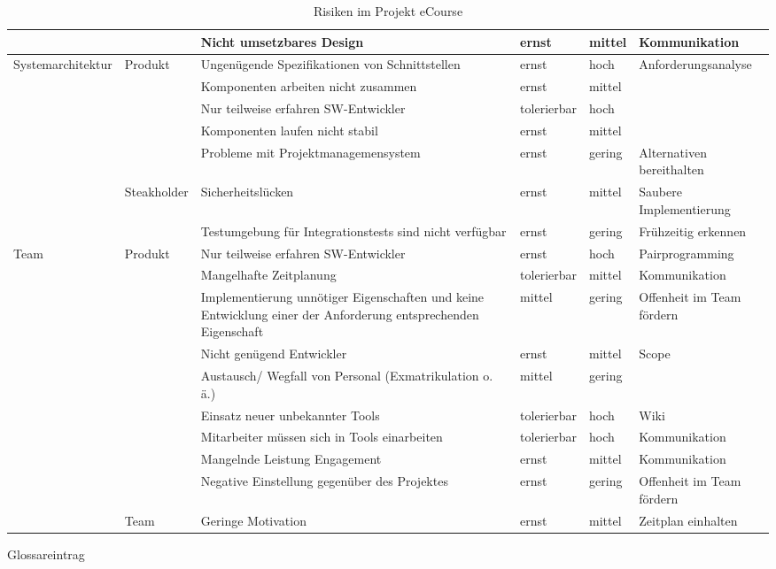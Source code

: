 \begin{table}
\begin{tabularx}{\textwidth}{|l|l|X|l|l|X|}
\hline
 &  & Nicht umsetzbares Design & ernst & mittel & Kommunikation  \\ 
\hline
Systemarchitektur & Produkt & Ungenügende Spezifikationen von Schnittstellen & ernst & hoch & Anforderungsanalyse \\ 
\hline
 &  & Komponenten arbeiten nicht zusammen & ernst & mittel &  \\ 
\hline
 &  & Nur teilweise erfahren SW-Entwickler & tolerierbar & hoch &  \\ 
\hline
 &  & Komponenten laufen nicht stabil & ernst & mittel &  \\ 
\hline
 &  & Probleme mit Projektmanagemensystem & ernst & gering & Alternativen bereithalten \\ 
\hline
 & Steakholder & Sicherheitslücken & ernst & mittel & Saubere Implementierung \\ 
\hline
 &  & Testumgebung für Integrationstests sind nicht verfügbar & ernst & gering & Frühzeitig erkennen \\ 
\hline
Team & Produkt & Nur teilweise erfahren SW-Entwickler & ernst & hoch & Pairprogramming \\ 
\hline
 &  & Mangelhafte Zeitplanung & tolerierbar & mittel & Kommunikation  \\ 
\hline
 &  & Implementierung unnötiger Eigenschaften und keine Entwicklung einer der Anforderung entsprechenden Eigenschaft & mittel & gering & Offenheit im Team fördern \\ 
\hline
 &  & Nicht genügend Entwickler & ernst & mittel & Scope  \\ 
\hline
 &  & Austausch/ Wegfall von Personal (Exmatrikulation o. ä.) & mittel & gering &  \\ 
\hline
 &  & Einsatz neuer unbekannter Tools & tolerierbar & hoch & Wiki \\ 
\hline
 &  & Mitarbeiter müssen sich in Tools einarbeiten & tolerierbar & hoch & Kommunikation  \\ 
\hline
 &  & Mangelnde Leistung Engagement & ernst & mittel & Kommunikation \\ 
\hline
 &  & Negative Einstellung gegenüber des Projektes & ernst & gering & Offenheit im Team fördern \\ 
\hline
 & Team & Geringe Motivation & ernst & mittel & Zeitplan einhalten \\ 
\hline
\end{tabularx}
\caption{Risiken im Projekt eCourse}
\label{tab:Risiken}
\end{table}


\gls{Glossareintrag}